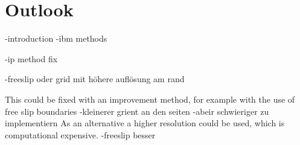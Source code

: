 \chapter{Outlook}

-introduction
-ibm methods

-ip method fix


-freeslip oder grid mit höhere auflösung am rand

This could be fixed with an improvement method, for example with the use of free slip boundaries
-kleinerer grient an den seiten
-abeir schwieriger zu implementiern
As an alternative a higher resolution  could be used, which is computational expensive.
-freeslip besser
